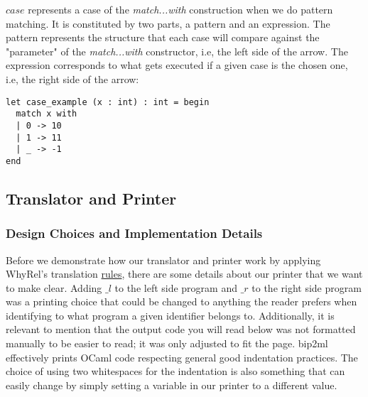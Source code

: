 $case$ represents a case of the \emph{match...with} construction when we do pattern matching.
It is constituted by two parts, a pattern and an expression.
The pattern represents the structure that each case will compare against the "parameter" of the \emph{match...with} constructor, i.e, the left side of the arrow.
The expression corresponds to what gets executed if a given case is the chosen one, i.e, the right side of the arrow:

\begin{lstlisting}[mathescape, basicstyle=\ttfamily, columns=flexible,
                    emph={type, and, let, rec, if, then, else, mod, in, for, while, do, done, to, begin, end, assert, match, with, of, open, include,ref},
                    emphstyle=\ttfamily\bfseries\color{myorange}]
let case_example (x : int) : int = begin
  match x with
  | 0 -> 10
  | 1 -> 11
  | _ -> -1 
end
\end{lstlisting}


\FloatBarrier
\subsection{Translator and Printer}
\label{subsec:translator_printer}

\subsubsection{Design Choices and Implementation Details}
\label{subsubsec:translator_printer_details}

Before we demonstrate how our translator and printer work by applying WhyRel's translation \hyperref[fig:translation-biprograms-rules]{rules}, there are some details about our printer that we want to make clear.
Adding $\_l$ to the left side program and $\_r$ to the right side program was a printing choice that could be changed to anything the reader prefers when identifying to what program a given identifier belongs to.
Additionally, it is relevant to mention that the output code you will read below was not formatted manually to be easier to read; it was only adjusted to fit the page.
bip2ml effectively prints OCaml code respecting general good indentation practices.
The choice of using two whitespaces for the indentation is also something that can easily change by simply setting a variable in our printer to a different value.

